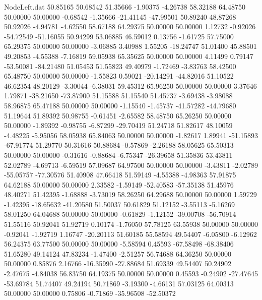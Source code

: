 \begin{filecontents}{NodeLeft.dat}
  50.85165   50.68542   51.35666    -1.90375   -4.26738   58.32188   64.48750   50.00000   50.00000   -0.68542   -1.35666  -21.41145  -47.99501
  50.89240   48.87268   50.92026    -4.94781   -4.62550   58.67188   64.29375   50.00000   50.00000    1.12732   -0.92026  -54.72549  -51.16055
  50.94299   53.06885   46.59012     0.13756   -1.61725   57.75000   65.29375   50.00000   50.00000   -3.06885    3.40988    1.55205  -18.24747
  51.01400   45.88501   49.20853    -4.55388   -7.16819   59.05938   65.35625   50.00000   50.00000    4.11499    0.79147  -53.50081  -84.21480
  51.05453   51.55823   49.40979    -1.72469   -3.83763   58.42500   65.48750   50.00000   50.00000   -1.55823    0.59021  -20.14291  -44.82016
  51.10522   46.62354   48.20129    -3.30044   -6.38031   59.45312   65.96250   50.00000   50.00000    3.37646    1.79871  -38.21650  -73.87900
  51.15588   51.15540   51.45737    -3.69438   -3.98088   58.96875   65.47188   50.00000   50.00000   -1.15540   -1.45737  -41.57282  -44.79680
  51.19644   51.89392   50.98755    -0.61451   -2.65582   58.48750   65.26250   50.00000   50.00000   -1.89392   -0.98755   -6.87299  -29.70419
  51.24718   51.82617   48.10059    -4.48225   -5.95056   58.05938   65.84063   50.00000   50.00000   -1.82617    1.89941  -51.15893  -67.91774
  51.29770   50.31616   50.88684    -0.57869   -2.26188   58.05625   65.50313   50.00000   50.00000   -0.31616   -0.88684   -6.75347  -26.39658
  51.35836   53.43811   52.02789    -4.69713   -6.59519   57.09687   64.97500   50.00000   50.00000   -3.43811   -2.02789  -55.05757  -77.30576
  51.40908   47.66418   51.59149    -4.55388   -4.98363   57.91875   64.62188   50.00000   50.00000    2.33582   -1.59149  -52.40583  -57.35138
  51.45976   48.40271   51.42395    -1.68888   -3.73019   58.26250   64.29688   50.00000   50.00000    1.59729   -1.42395  -18.65632  -41.20580
  51.50037   50.61829   51.12152    -3.55113   -5.16269   58.01250   64.04688   50.00000   50.00000   -0.61829   -1.12152  -39.00708  -56.70914
  51.55116   50.92041   51.92719     0.10174   -1.76050   57.78125   63.55938   50.00000   50.00000   -0.92041   -1.92719    1.16747  -20.20113
  51.60185   55.58594   49.54407    -6.05800   -6.12962   56.24375   63.77500   50.00000   50.00000   -5.58594    0.45593  -67.58498  -68.38406
  51.65280   49.14124   47.83234    -1.47400   -2.51257   56.74688   64.36250   50.00000   50.00000    0.85876    2.16766  -16.35990  -27.88684
  51.69339   49.54407   50.24902    -2.47675   -4.84038   56.83750   64.19375   50.00000   50.00000    0.45593   -0.24902  -27.47645  -53.69784
  51.74407   49.24194   50.71869    -3.19300   -4.66131   57.03125   64.00313   50.00000   50.00000    0.75806   -0.71869  -35.96508  -52.50372

\end{filecontents}
